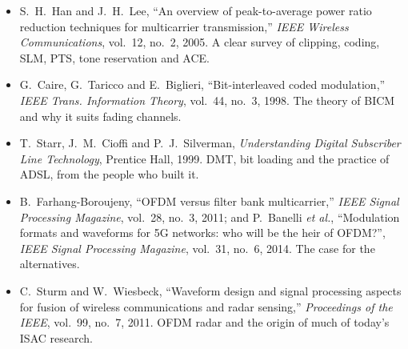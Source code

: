 \begin{itemize}
interchannel interference of OFDM in time-varying impairments,'' \emph{IEEE Trans. Communications}, vol.~49, no.~3,
2001. The ICI analysis of Section~\ref{sec:ch17:sync}.
\item S.~H.~Han and J.~H.~Lee, ``An overview of peak-to-average power ratio reduction techniques for multicarrier
transmission,'' \emph{IEEE Wireless Communications}, vol.~12, no.~2, 2005. A clear survey of clipping, coding, SLM,
PTS, tone reservation and ACE.
\item G.~Caire, G.~Taricco and E.~Biglieri, ``Bit-interleaved coded modulation,'' \emph{IEEE Trans. Information Theory},
vol.~44, no.~3, 1998. The theory of BICM and why it suits fading channels.
\item T.~Starr, J.~M.~Cioffi and P.~J.~Silverman, \emph{Understanding Digital Subscriber Line Technology}, Prentice
Hall, 1999. DMT, bit loading and the practice of ADSL, from the people who built it.
\item B.~Farhang-Boroujeny, ``OFDM versus filter bank multicarrier,'' \emph{IEEE Signal Processing Magazine}, vol.~28,
no.~3, 2011; and P.~Banelli \emph{et al.}, ``Modulation formats and waveforms for 5G networks: who will be the heir of
OFDM?'', \emph{IEEE Signal Processing Magazine}, vol.~31, no.~6, 2014. The case for the alternatives.
\item C.~Sturm and W.~Wiesbeck, ``Waveform design and signal processing aspects for fusion of wireless communications
and radar sensing,'' \emph{Proceedings of the IEEE}, vol.~99, no.~7, 2011. OFDM radar and the origin of much of today's
ISAC research.
\end{itemize}
